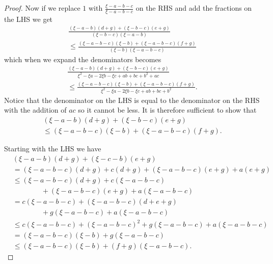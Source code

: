 \documentclass[a4paper]{report}
\begin{document}
\begin{proof}
  Now if we replace $1$ with $\frac{\xi -a-b-c}{\xi -a-b-c}$ on the RHS and add
  the fractions on the LHS we get
  \begin{multline*}
    \frac{(\xi -a-b)(d+g)+(\xi -b-c)(e+g)}{(\xi -b-c)(\xi -a-b)}\\
    \leq \frac{(\xi -a-b-c)(\xi -b)+(\xi -a-b-c)(f+g)}{(\xi -b)(\xi -a-b-c)}
  \end{multline*}
  which when we expand the denominators becomes
  \begin{multline*}
    \frac{(\xi -a-b)(d+g)+(\xi -b-c)(e+g)}{\xi ^2-\xi a-2\xi b-\xi c+ab+bc+b^2+ac}\\
    \leq \frac{(\xi -a-b-c)(\xi -b)+(\xi -a-b-c)(f+g)}{\xi ^2-\xi a-2\xi b-\xi c+ab+bc+b^2}.
  \end{multline*}
  Notice that the denominator on the LHS is equal to the denominator on the
  RHS with the addition of $ac$ so it cannot be less.  It is therefore
  sufficient to show that
  \begin{multline*}
    (\xi -a-b)(d+g)+(\xi -b-c)(e+g)\\
    \leq (\xi -a-b-c)(\xi -b)+(\xi -a-b-c)(f+g).
  \end{multline*}

  Starting with the LHS we have
  \begin{align*}
    &(\xi -a-b)(d+g)+(\xi -c-b)(e+g)\\
    &= (\xi -a-b-c)(d+g)+c(d+g)+(\xi -a-b-c)(e+g)+a(e+g)\\
    &\leq (\xi -a-b-c)(d+g)+c(\xi -a-b-c)\\
    &\qquad\qquad+(\xi -a-b-c)(e+g)+a(\xi -a-b-c)\\
    &= c(\xi -a-b-c)+(\xi -a-b-c)(d+e+g)\\
    &\qquad\qquad+g(\xi -a-b-c)+a(\xi -a-b-c)\\
    &\leq c(\xi -a-b-c)+(\xi -a-b-c)^2+g(\xi -a-b-c)+a(\xi -a-b-c)\\
    &= (\xi -a-b-c)(\xi -b)+g(\xi -a-b-c)\\
    &\leq (\xi -a-b-c)(\xi -b) + (f+g)(\xi -a-b-c).
  \end{align*}
\end{proof}
\end{document}
